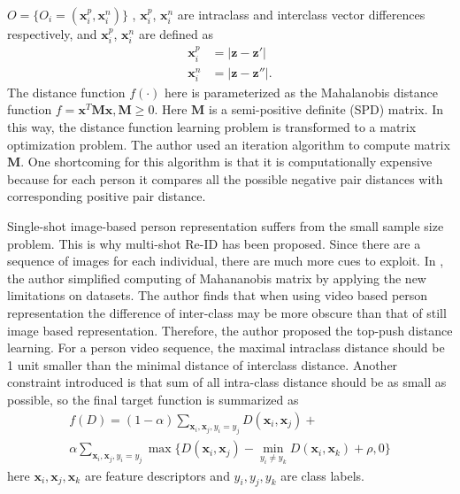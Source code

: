 $O=\{O_i=(\bm{x}_i^p, \bm{x}_i^n)\}$ , $\bm{x}_i^p$, $\bm{x}_i^n$ are intraclass and interclass vector differences respectively, and $\bm{x}_i^p$, $\bm{x}_i^n$ are defined as
\begin{equation}
\begin{aligned}
\bm{x}_i^p &= |\bm{z} - \bm{z}'| \\
\bm{x}_i^n &= |\bm{z} - \bm{z}''|.
\end{aligned}
\end{equation}
The distance function $f(\cdot)$ here is parameterized as the Mahalanobis distance function
$f=\bm{x}^T\bm{M}\bm{x},\bm{M\ge}0$. Here $\bm{M}$ is a semi-positive definite (SPD) matrix. In this way, the distance function learning problem is transformed to a matrix optimization problem. The author used an iteration algorithm to compute matrix $\bm{M}$. One shortcoming for this algorithm is that it is computationally expensive because for each person it compares all the possible negative pair distances with corresponding positive pair distance. 

Single-shot image-based person representation suffers from the small sample size problem. This is why multi-shot Re-ID has been proposed. Since there are a sequence of images for each individual, there are much more cues to exploit.
In \cite{TDL}, the author simplified computing of Mahananobis matrix by applying the new limitations on datasets. The author finds that when using video based person representation the difference of inter-class may be more obscure than that of still image based representation. Therefore, the author proposed the top-push distance learning. For a person video sequence, the maximal intraclass distance should be 1 unit smaller than the minimal distance of interclass distance. Another constraint introduced is that sum of all intra-class distance should be as small as possible, so the final target function is summarized as 
\begin{equation}
\begin{aligned}
f(D) = (1-\alpha)\sum_{\bm{x}_i,\bm{x}_j,y_i=y_j} D(\bm{x}_i,\bm{x}_j) + \\
\alpha \sum_{\bm{x}_i,\bm{x}_j,y_i=y_j}\max\{{D(\bm{x}_i,\bm{x}_j)-\min_{y_i\ne y_k}{D(\bm{x}_i,\bm{x}_k)}+\rho,0}\}
\end{aligned}
\end{equation}
here $\bm{x}_i, \bm{x}_j, \bm{x}_k$ are feature descriptors and $y_i, y_j, y_k$ are class labels.

